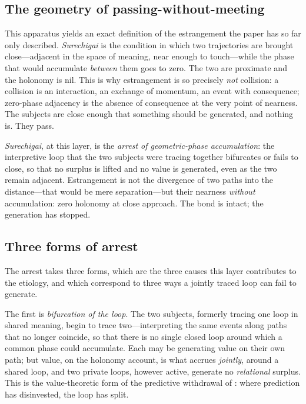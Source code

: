\subsection{The geometry of passing-without-meeting}
\label{p17:sub:phase-geometry}

This apparatus yields an exact definition of the estrangement the paper has so far only described. \emph{Surechigai} is the condition in which two trajectories are brought close---adjacent in the space of meaning, near enough to touch---while the phase that would accumulate \emph{between} them goes to zero. The two are proximate and the holonomy is nil. This is why estrangement is so precisely \emph{not} collision: a collision is an interaction, an exchange of momentum, an event with consequence; zero-phase adjacency is the absence of consequence at the very point of nearness. The subjects are close enough that something should be generated, and nothing is. They pass.

\begin{claim}
\emph{Surechigai}, at this layer, is the \emph{arrest of geometric-phase accumulation}: the interpretive loop that the two subjects were tracing together bifurcates or fails to close, so that no surplus is lifted and no value is generated, even as the two remain adjacent. Estrangement is not the divergence of two paths into the distance---that would be mere separation---but their nearness \emph{without} accumulation: zero holonomy at close approach. The bond is intact; the generation has stopped.
\end{claim}

\subsection{Three forms of arrest}
\label{p17:sub:phase-forms}

The arrest takes three forms, which are the three causes this layer contributes to the etiology, and which correspond to three ways a jointly traced loop can fail to generate.

The first is \emph{bifurcation of the loop}. The two subjects, formerly tracing one loop in shared meaning, begin to trace two---interpreting the same events along paths that no longer coincide, so that there is no single closed loop around which a common phase could accumulate. Each may be generating value on their own path; but value, on the holonomy account, is what accrues \emph{jointly}, around a shared loop, and two private loops, however active, generate no \emph{relational} surplus. This is the value-theoretic form of the predictive withdrawal of : where prediction has disinvested, the loop has split.

